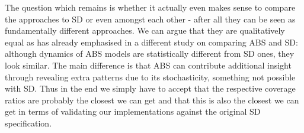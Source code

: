 \medskip

The question which remains is whether it actually even makes sense to compare the approaches to SD or even amongst each other - after all they can be seen as fundamentally different approaches. We can argue that they are qualitatively equal as \cite{figueredo_comparing_2014} has already emphasised in a different study on comparing ABS and SD: although dynamics of ABS models are statistically different from SD ones, they look similar. The main difference is that ABS can contribute additional insight through revealing extra patterns due to its stochasticity, something not possible with SD. Thus in the end we simply have to accept that the respective coverage ratios are probably the closest we can get and that this is also the closest we can get in terms of validating our implementations against the original SD specification.

